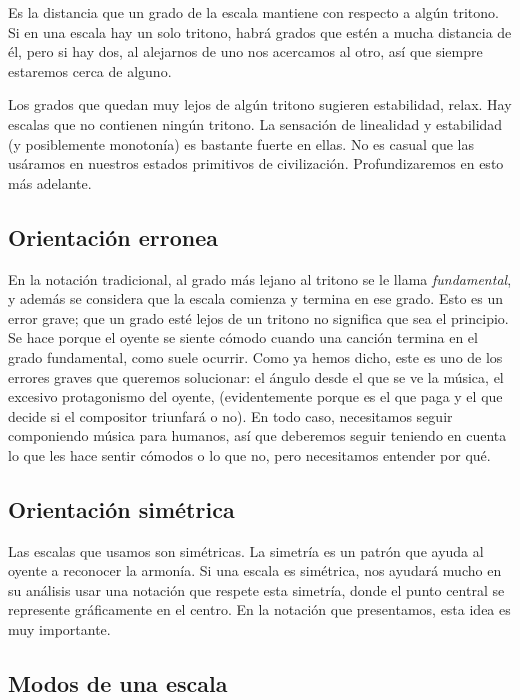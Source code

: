 \documentclass[]{article}
\begin{document}
Es la distancia que un grado de la escala mantiene con respecto a algún tritono. Si en una escala hay un solo tritono, habrá grados que estén a mucha distancia de él, pero si hay dos, al alejarnos de uno nos acercamos al otro, así que siempre estaremos cerca de alguno.

Los grados que quedan muy lejos de algún tritono sugieren estabilidad, relax. Hay escalas que no contienen ningún tritono. La sensación de linealidad y estabilidad (y posiblemente monotonía) es bastante fuerte en ellas. No es casual que las usáramos en nuestros estados primitivos de civilización. Profundizaremos en esto más adelante.

\subsection{Orientación erronea}

En la notación tradicional, al grado más lejano al tritono se le llama \emph{fundamental}, y además se considera que la escala comienza y termina en ese grado. Esto es un error grave; que un grado esté lejos de un tritono no significa que sea el principio. Se hace porque el oyente se siente cómodo cuando una canción termina en el grado fundamental, como suele ocurrir. Como ya hemos dicho, este es uno de los errores graves que queremos solucionar: el ángulo desde el que se ve la música, el excesivo protagonismo del oyente, (evidentemente porque es el que paga y el que decide si el compositor triunfará o no). En todo caso, necesitamos seguir componiendo música para humanos, así que deberemos seguir teniendo en cuenta lo que les hace sentir cómodos o lo que no, pero necesitamos entender por qué.

\subsection{Orientación simétrica}

Las escalas que usamos son simétricas. La simetría es un patrón que ayuda al oyente a reconocer la armonía. Si una escala es simétrica, nos ayudará mucho en su análisis usar una notación que respete esta simetría, donde el punto central se represente gráficamente en el centro. En la notación que presentamos, esta idea es muy importante.

\subsection{Modos de una escala}
\end{document}
